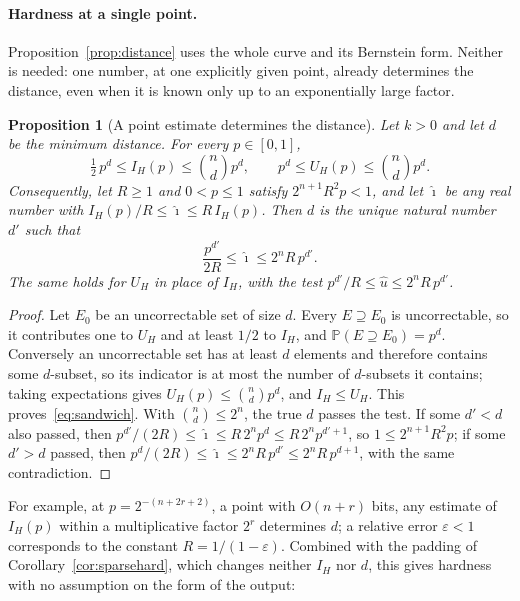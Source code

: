 \documentclass[11pt]{article}
\newtheorem{proposition}[theorem]{Proposition}
\theoremstyle{remark}
\newcommand{\Prob}{\mathbb P}
\newcommand{\eps}{\varepsilon}
\begin{document}
\paragraph{Hardness at a single point.}
Proposition~\ref{prop:distance} uses the whole curve and its Bernstein
form. Neither is needed: one number, at one explicitly given point,
already determines the distance, even when it is known only up to an
exponentially large factor.

\begin{proposition}[A point estimate determines the distance]
\label{prop:point}
Let \(k>0\) and let \(d\) be the minimum distance. For every
\(p\in[0,1]\),
\begin{equation}\label{eq:sandwich}
 \tfrac12\,p^d\le I_H(p)\le\binom nd p^d,
 \qquad
 p^d\le U_H(p)\le\binom nd p^d .
\end{equation}
Consequently, let \(R\ge1\) and \(0<p\le1\) satisfy \(2^{n+1}R^2p<1\),
and let \(\widehat\imath\) be any real number with
\(I_H(p)/R\le\widehat\imath\le R\,I_H(p)\). Then \(d\) is the unique
natural number \(d'\) such that
\[
 \frac{p^{d'}}{2R}\le\widehat\imath\le2^nR\,p^{d'} .
\]
The same holds for \(U_H\) in place of \(I_H\), with the test
\(p^{d'}/R\le\widehat u\le2^nR\,p^{d'}\).
\end{proposition}
\begin{proof}
Let \(E_0\) be an uncorrectable set of size \(d\). Every \(E\supseteq E_0\)
is uncorrectable, so it contributes one to \(U_H\) and at least \(1/2\)
to \(I_H\), and \(\Prob(E\supseteq E_0)=p^d\). Conversely an
uncorrectable set has at least \(d\) elements and therefore contains
some \(d\)-subset, so its indicator is at most the number of
\(d\)-subsets it contains; taking expectations gives
\(U_H(p)\le\binom ndp^d\), and \(I_H\le U_H\). This
proves~\eqref{eq:sandwich}. With \(\binom nd\le2^n\), the true \(d\)
passes the test. If some \(d'<d\) also passed, then
\(p^{d'}/(2R)\le\widehat\imath\le R\,2^np^d\le R\,2^np^{d'+1}\), so
\(1\le2^{n+1}R^2p\); if some \(d'>d\) passed, then
\(p^d/(2R)\le\widehat\imath\le2^nR\,p^{d'}\le2^nR\,p^{d+1}\), with the
same contradiction.
\end{proof}

For example, at \(p=2^{-(n+2r+2)}\), a point with \(O(n+r)\) bits, any
estimate of \(I_H(p)\) within a multiplicative factor \(2^r\) determines
\(d\); a relative error \(\eps<1\) corresponds to the constant
\(R=1/(1-\eps)\). Combined with the padding of
Corollary~\ref{cor:sparsehard}, which changes neither \(I_H\) nor \(d\),
this gives hardness with no assumption on the form of the output:
\end{document}
